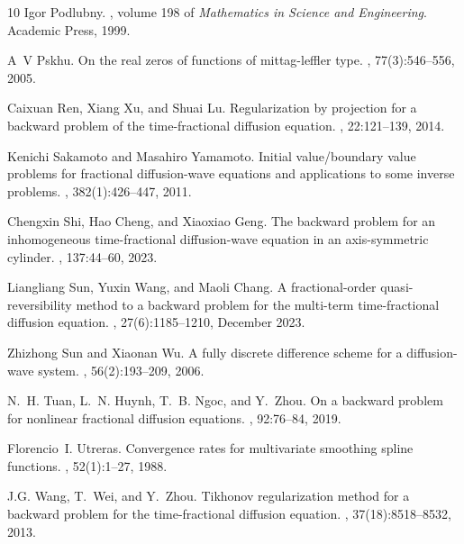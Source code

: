 \documentclass[11pt]{article}
\numberwithin{equation}{section}
\begin{document}
\begin{thebibliography}{10}
Igor Podlubny.
, volume 198 of {\em Mathematics in Science
  and Engineering}.
\newblock Academic Press, 1999.

A~V Pskhu.
\newblock On the real zeros of functions of mittag-leffler type.
, 77(3):546--556, 2005.

Caixuan Ren, Xiang Xu, and Shuai Lu.
\newblock Regularization by projection for a backward problem of the
  time-fractional diffusion equation.
, 22:121--139, 2014.

Kenichi Sakamoto and Masahiro Yamamoto.
\newblock Initial value/boundary value problems for fractional diffusion-wave
  equations and applications to some inverse problems.
,
  382(1):426--447, 2011.

Chengxin Shi, Hao Cheng, and Xiaoxiao Geng.
\newblock The backward problem for an inhomogeneous time-fractional
  diffusion-wave equation in an axis-symmetric cylinder.
, 137:44--60, 2023.

Liangliang Sun, Yuxin Wang, and Maoli Chang.
\newblock A fractional-order quasi-reversibility method to a backward problem
  for the multi-term time-fractional diffusion equation.
, 27(6):1185--1210, December
  2023.

Zhizhong Sun and Xiaonan Wu.
\newblock A fully discrete difference scheme for a diffusion-wave system.
, 56(2):193--209, 2006.

N.~H. Tuan, L.~N. Huynh, T.~B. Ngoc, and Y.~Zhou.
\newblock On a backward problem for nonlinear fractional diffusion equations.
, 92:76--84, 2019.

Florencio~I. Utreras.
\newblock Convergence rates for multivariate smoothing spline functions.
, 52(1):1--27, 1988.

J.G. Wang, T.~Wei, and Y.~Zhou.
\newblock Tikhonov regularization method for a backward problem for the
  time-fractional diffusion equation.
, 37(18):8518--8532, 2013.


\end{thebibliography}
\end{document}
